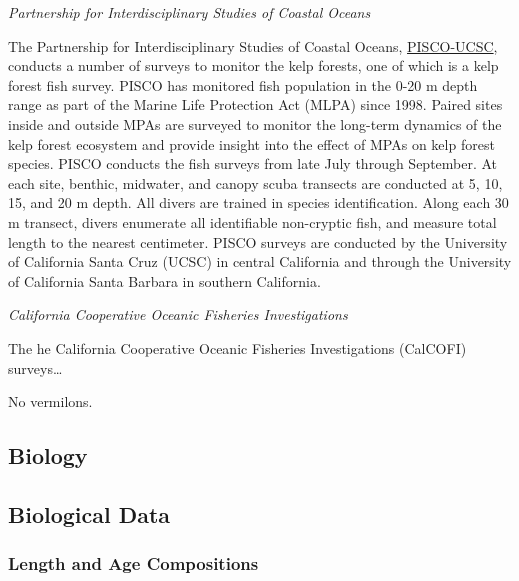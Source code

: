 \documentclass[11pt,
  english,
  a4paper,
]{article}
\begin{document}
\emph{Partnership for Interdisciplinary Studies of Coastal Oceans}

The Partnership for Interdisciplinary Studies of Coastal Oceans, {\href{http://www.piscoweb.org/kelp-forest-study}{PISCO-UCSC}\leavevmode\tagmcend\tagstructend}, conducts a number of surveys to monitor the kelp forests, one of which is a kelp forest fish survey. PISCO has monitored fish population in the 0-20 m depth range as part of the Marine Life Protection Act (MLPA) since 1998. Paired sites inside and outside MPAs are surveyed to monitor the long-term dynamics of the kelp forest ecosystem and provide insight into the effect of MPAs on kelp forest species. PISCO conducts the fish surveys from late July through September. At each site, benthic, midwater, and canopy scuba transects are conducted at 5, 10, 15, and 20 m depth. All divers are trained in species identification. Along each 30 m transect, divers enumerate all identifiable non-cryptic fish, and measure total length to the nearest centimeter. PISCO surveys are conducted by the University of California Santa Cruz (UCSC) in central California and through the University of California Santa Barbara in southern California.

\emph{California Cooperative Oceanic Fisheries Investigations}

The he California Cooperative Oceanic Fisheries Investigations (CalCOFI) surveys\ldots{}

No vermilons.


\hypertarget{biology}{%
\subsection{Biology}\label{biology}}

\leavevmode\tagmcend\tagstructend


\hypertarget{biological-data}{%
\subsection{Biological Data}\label{biological-data}}

\leavevmode\tagmcend\tagstructend


\hypertarget{length-and-age-compositions}{%
\subsubsection{Length and Age Compositions}\label{length-and-age-compositions}}
\end{document}
